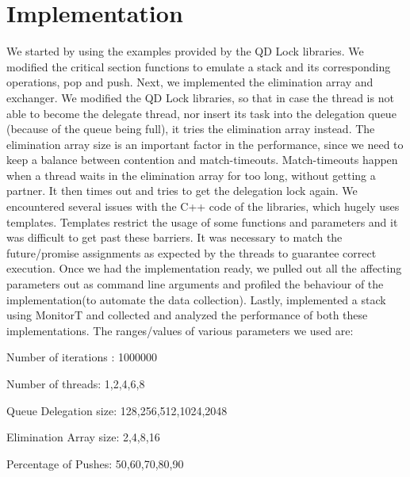 \section{Implementation}
We started by using the examples provided by the QD Lock libraries. We modified the critical section functions to emulate a stack and its corresponding operations, pop and push. 
Next, we implemented the elimination array and exchanger. We modified the QD Lock libraries, so that in case the thread is not able to become the delegate thread, nor insert its task into the delegation queue (because of the queue being full), it tries the elimination array instead. The elimination array size is an important factor in the performance, since we need to keep a balance between contention and match-timeouts. Match-timeouts happen when a thread waits in the elimination array for too long, without getting a partner. It then times out and tries to get the delegation lock again.
We encountered several issues with the C++ code of the libraries, which hugely uses templates. Templates restrict the usage of some functions and parameters and it was difficult to get past these barriers. It was necessary to match the future/promise assignments as expected by the threads to guarantee correct execution.
Once we had the implementation ready, we pulled out all the affecting parameters out as command line arguments and profiled the behaviour of the implementation(to automate the data collection). Lastly, implemented a stack using MonitorT and collected and analyzed the performance of both these implementations.
The ranges/values of various parameters we used are:
\begin{list}
\item Number of iterations : 1000000
\item Number of threads: 1,2,4,6,8
\item Queue Delegation size: 128,256,512,1024,2048
\item Elimination Array size: 2,4,8,16
\item Percentage of Pushes: 50,60,70,80,90
\end{list}

